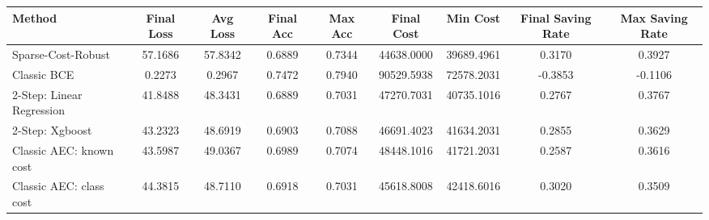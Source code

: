 \begin{tabular}{lcccccccc}
\toprule
Method & Final Loss & Avg Loss & Final Acc & Max Acc & Final Cost & Min Cost & Final Saving Rate & Max Saving Rate \\
\midrule
Sparse-Cost-Robust & 57.1686 & 57.8342 & 0.6889 & 0.7344 & 44638.0000 & 39689.4961 & 0.3170 & 0.3927 \\
Classic BCE & 0.2273 & 0.2967 & 0.7472 & 0.7940 & 90529.5938 & 72578.2031 & -0.3853 & -0.1106 \\
2-Step: Linear Regression & 41.8488 & 48.3431 & 0.6889 & 0.7031 & 47270.7031 & 40735.1016 & 0.2767 & 0.3767 \\
2-Step: Xgboost & 43.2323 & 48.6919 & 0.6903 & 0.7088 & 46691.4023 & 41634.2031 & 0.2855 & 0.3629 \\
Classic AEC: known cost & 43.5987 & 49.0367 & 0.6989 & 0.7074 & 48448.1016 & 41721.2031 & 0.2587 & 0.3616 \\
Classic AEC: class cost & 44.3815 & 48.7110 & 0.6918 & 0.7031 & 45618.8008 & 42418.6016 & 0.3020 & 0.3509 \\
\bottomrule
\end{tabular}
